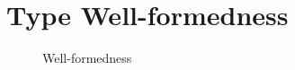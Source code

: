 \section{Type Well-formedness}

\begin{figure}[h]
\framebox{$ \judgeewf \gamma \tau $}

\begin{mathpar}






\end{mathpar}
\caption{Well-formedness}
\end{figure}
